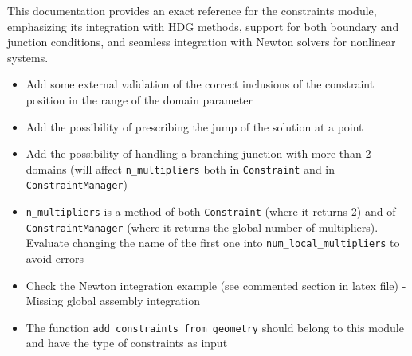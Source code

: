 This documentation provides an exact reference for the constraints module, emphasizing its integration with HDG methods, support for both boundary and junction conditions, and seamless integration with Newton solvers for nonlinear systems.

\begin{todobox}
		\begin{itemize}[leftmargin=1.5em]
			\item Add some external validation of the correct inclusions of the constraint position in the range of the domain parameter
			\item Add the possibility of prescribing the jump of the solution at a point
			
			\item Add the possibility of handling a branching junction with more than 2 domains (will affect {\tt n\_multipliers} both in {\tt Constraint} and in {\tt ConstraintManager})
			
			\item {\tt n\_multipliers} is a method of both {\tt Constraint} (where it returns 2) and of {\tt ConstraintManager} (where it returns the global number of multipliers). Evaluate changing the name of the first one into {\tt num\_local\_multipliers} to avoid errors
			
			\item Check the Newton integration example (see commented section in latex file) - Missing global assembly integration
			\item The function {\tt add\_constraints\_from\_geometry} should belong to this module and have the type of constraints as input
			\end{itemize}
\end{todobox}


